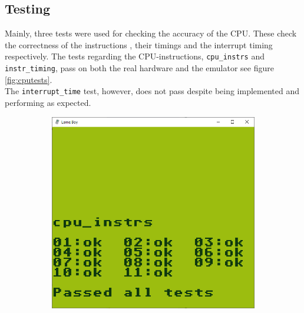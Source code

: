 \subsection{Testing}
Mainly, three tests were used for checking the accuracy of the CPU. These check the correctness of the instructions \cite{Blargg}, their timings and the interrupt timing respectively. The tests regarding the CPU-instructions, \texttt{cpu\_instrs} and \texttt{instr\_timing}, pass on both the real hardware \cite{TestROMsResult} and the emulator see figure \ref{fig:cputests}. 
\\The \texttt{interrupt\_time} test, however, does not pass despite being implemented and performing as expected. 

\begin{figure}[H]
\centering
\begin{subfigure}{.5\textwidth}
  \centering
  \includegraphics[width=0.9\linewidth]{figures/cpu_instrs_passed.PNG}
\end{subfigure}%
\begin{subfigure}{.5\textwidth}
  \centering

\end{subfigure}
\end{figure}
